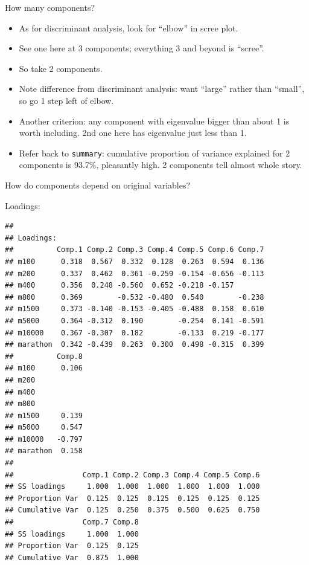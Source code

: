 \documentclass[ignorenonframetext,]{beamer}
\newenvironment{Shaded}{\begin{snugshade}}{\end{snugshade}}
\newcommand{\NormalTok}[1]{#1}
\newcommand{\OperatorTok}[1]{\textcolor[rgb]{0.81,0.36,0.00}{\textbf{#1}}}
\begin{document}
\begin{frame}[fragile]{How many components?}
\protect\hypertarget{how-many-components}{}

\begin{itemize}
\item
  As for discriminant analysis, look for ``elbow'' in scree plot.
\item
  See one here at 3 components; everything 3 and beyond is ``scree''.
\item
  So take 2 components.
\item
  Note difference from discriminant analysis: want ``large'' rather than
  ``small'', so go 1 step left of elbow.
\item
  Another criterion: any component with eigenvalue bigger than about 1
  is worth including. 2nd one here has eigenvalue just less than 1.
\item
  Refer back to \texttt{summary}: cumulative proportion of variance
  explained for 2 components is 93.7\%, pleasantly high. 2 components
  tell almost whole story.
\end{itemize}

\end{frame}

\begin{frame}[fragile]{How do components depend on original variables?}
\protect\hypertarget{how-do-components-depend-on-original-variables}{}

Loadings:

\begin{Shaded}
\end{Shaded}

\begin{verbatim}
## 
## Loadings:
##          Comp.1 Comp.2 Comp.3 Comp.4 Comp.5 Comp.6 Comp.7
## m100      0.318  0.567  0.332  0.128  0.263  0.594  0.136
## m200      0.337  0.462  0.361 -0.259 -0.154 -0.656 -0.113
## m400      0.356  0.248 -0.560  0.652 -0.218 -0.157       
## m800      0.369        -0.532 -0.480  0.540        -0.238
## m1500     0.373 -0.140 -0.153 -0.405 -0.488  0.158  0.610
## m5000     0.364 -0.312  0.190        -0.254  0.141 -0.591
## m10000    0.367 -0.307  0.182        -0.133  0.219 -0.177
## marathon  0.342 -0.439  0.263  0.300  0.498 -0.315  0.399
##          Comp.8
## m100      0.106
## m200           
## m400           
## m800           
## m1500     0.139
## m5000     0.547
## m10000   -0.797
## marathon  0.158
## 
##                Comp.1 Comp.2 Comp.3 Comp.4 Comp.5 Comp.6
## SS loadings     1.000  1.000  1.000  1.000  1.000  1.000
## Proportion Var  0.125  0.125  0.125  0.125  0.125  0.125
## Cumulative Var  0.125  0.250  0.375  0.500  0.625  0.750
##                Comp.7 Comp.8
## SS loadings     1.000  1.000
## Proportion Var  0.125  0.125
## Cumulative Var  0.875  1.000
\end{verbatim}

\end{frame}
\end{document}
